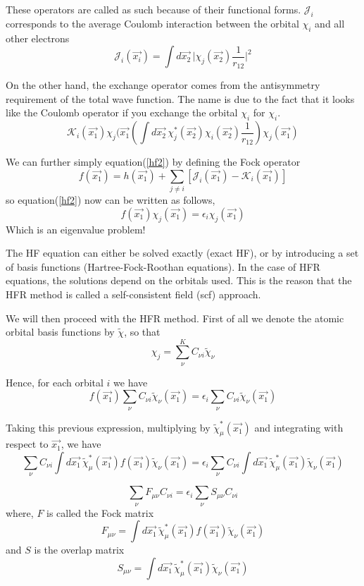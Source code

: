 \documentclass[a4paper]{article}
\begin{document}
These operators are called as such because of their functional forms.
$\mathcal{J}_i$ corresponds to the average Coulomb interaction between the orbital $\chi_i$ and all other electrons
$$
\mathcal{J}_i (\vec{x_i}) =
\int d\vec{x_2} \, \big| \chi_{j} (\vec{x_2}) \frac{1}{r_{12}}\big|^2 
$$

On the other hand, the exchange operator comes from the antisymmetry requirement of the total wave function. The name is due to the fact that it looks like the Coulomb operator if you exchange the orbital $\chi_i$ for $\chi_i$.
$$
\mathcal{K}_i(\vec{x_1}) \chi_{j} (\vec{x_1}
\left( \int d\vec{x_2} \, \chi^{*}_{j} (\vec{x_2}) \chi_i (\vec{x_2})  \frac{1}{r_{12}} \right) \chi_{j} (\vec{x_1})
$$

We can further simply equation(\ref{hf2}) by defining the Fock operator
$$
f(\vec{x_1}) = h(\vec{x_1}) + \sum_{j\neq i}\left[ \mathcal{J}_i(\vec{x_1}) - \mathcal{K}_i(\vec{x_1}) \right]
$$
so equation(\ref{hf2}) now can be written as follows,
$$
f(\vec{x_1}) \chi_{j}(\vec{x_1}) = \epsilon_i \chi_{j} (\vec{x_1})
$$
Which is an eigenvalue problem!

The HF equation can either be solved exactly (exact HF), or by introducing a set of basis functions (Hartree-Fock-Roothan equations).
In the case of HFR equations, the solutions depend on the orbitals used.
This is the reason that the HFR method is called a self-consistent field (scf) approach.

We will then proceed with the HFR method.
First of all we denote the atomic orbital basis functions by $\tilde{\chi}$, so that
$$
\chi_{j} = \sum^{K}_{\nu} C_{\nu i} \tilde{\chi}_{\nu}
$$

Hence, for each orbital $i$ we have
$$
f(\vec{x_1}) \sum_{\nu} C_{\nu i} \tilde{\chi}_{\nu}(\vec{x_1}) = \epsilon_i \sum_{\nu} C_{\nu i} \tilde{\chi}_{\nu}(\vec{x_1})
$$

Taking this previous expression, multiplying by $\tilde{\chi}^{*}_{\mu} (\vec{x_1})$ and integrating with respect to $\vec{x_1}$, we have
$$
\sum_\nu C_{\nu i} \int d\vec{x_1} \, \tilde{\chi}^{*}_{\mu}(\vec{x_1}) f(\vec{x_1}) \tilde{\chi}_{\nu}(\vec{x_1}) =
\epsilon_i \sum_\nu C_{\nu i} \int d\vec{x_1} \, \tilde{\chi}^{*}_{\mu}(\vec{x_1}) \tilde{\chi}_{\nu}(\vec{x_1})
$$

$$
\sum_\nu F_{\mu\nu} C_{\nu i} = \epsilon_i \sum_\nu S_{\mu\nu} C_{\nu i}
$$
where, $F$ is called the Fock matrix 
$$
 F_{\mu\nu} = \int d\vec{x_1} \, \tilde{\chi}^{*}_{\mu}(\vec{x_1}) f(\vec{x_1}) \tilde{\chi}_{\nu}(\vec{x_1})
$$
and $S$ is the overlap matrix
$$
S_{\mu\nu} = \int d\vec{x_1} \, \tilde{\chi}^{*}_{\mu}(\vec{x_1}) \tilde{\chi}_{\nu}(\vec{x_1})
$$
\end{document}
